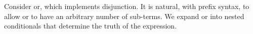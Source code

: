 \secdown

Consider or, which implements disjunction. It is natural, with prefix syntax, to
allow or to have an arbitrary number of sub-terms. We expand or into nested
conditionals that determine the truth of the expression.




\secup
